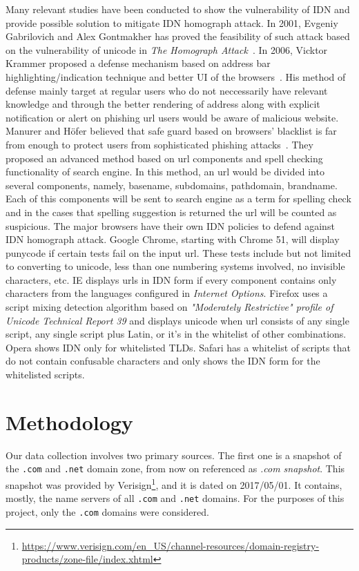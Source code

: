 \documentclass[letterpaper,twocolumn,10pt]{article}
\begin{document}
Many relevant studies have been conducted to show the vulnerability of IDN and provide possible solution to mitigate IDN homograph attack.
In 2001, Evgeniy Gabrilovich and Alex Gontmakher has proved the feasibility of such attack based on the vulnerability of unicode in \textit{The Homograph Attack}~\cite{theHomoAttack}.
In 2006, Vicktor Krammer proposed a defense mechanism based on address bar highlighting/indication technique and better UI of the browsers~\cite{phishdefenseKV}.
His method of defense mainly target at regular users who do not neccessarily have relevant knowledge and through the better rendering of address along with explicit notification or alert on phishing url users would be aware of malicious website.
Manurer and Höfer believed that safe guard based on browsers' blacklist is far from enough to protect users from sophisticated phishing attacks~\cite{proc-eds-2012}.
They proposed an advanced method based on url components and spell checking functionality of search engine.
In this method, an url would be divided into several components, namely, basename, subdomains, pathdomain, brandname.
Each of this components will be sent to search engine as a term for spelling check and in the cases that spelling suggestion is returned the url will be counted as suspicious.
The major browsers have their own IDN policies to defend against IDN homograph attack.
Google Chrome, starting with Chrome 51, will display punycode if certain tests fail on the input url.
These tests include but not limited to converting to unicode, less than one numbering systems involved, no invisible characters, etc.
IE displays urls in IDN form if every component contains only characters from the languages configured in \textit{Internet Options}.
Firefox uses a script mixing detection algorithm based on \textit{"Moderately Restrictive" profile of Unicode Technical Report 39} and displays unicode when url consists of any single script, any single script plus Latin, or it's in the whitelist of other combinations.
Opera shows IDN only for whitelisted TLDs.
Safari has a whitelist of scripts that do not contain confusable characters and only shows the IDN form for the whitelisted scripts.

\section{Methodology}
Our data collection involves two primary sources.
The first one is a snapshot of the \texttt{.com} and \texttt{.net} domain zone, from now on referenced as \textit{.com snapshot}.
This snapshot was provided by Verisign\footnote{\url{https://www.verisign.com/en_US/channel-resources/domain-registry-products/zone-file/index.xhtml}}, and it is dated on 2017/05/01.
It contains, mostly, the name servers of all \texttt{.com} and \texttt{.net} domains.
For the purposes of this project, only the \texttt{.com} domains were considered.
\end{document}
